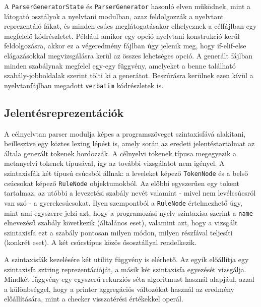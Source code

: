 \documentclass[twoside, 12pt]{report}
\begin{document}
A \verb|ParserGeneratorState| és \verb|ParserGenerator| hasonló elven működnek, mint a látogató osztályok a nyelvtani modulban, azaz feldolgozzák a nyelvtant reprezentáló fákat, és minden csúcs meglátogatásakor elhelyeznek a célfájlban egy megfelelő kódrészletet. Például amikor egy opció nyelvtani konstrukció kerül feldolgozásra, akkor ez a végeredmény fájlban úgy jelenik meg, hogy if-elif-else elágazásokkal megvizsgálásra kerül az összes lehetséges opció. A generált fájlban minden szabálynak megfelel egy-egy függvény, amelyeket a benne található szabály-jobboldalak szerint tölti ki a generátot. Beszúrásra kerülnek ezen kívül a nyelvtanfájlban megadott \verb|verbatim| kódrészletek is.

\subsection{Jelentésreprezentációk}

A célnyelvtan parser modulja képes a programszöveget szintaxisfává alakítani, beillesztve egy köztes lexing lépést is, amely során az eredeti jelentéstartalmat az általa generált tokenek hordozzák. A célnyelvi tokenek típusa megegyezik a metanyelvi tokenek típusával, így az további vizsgálatot nem igényel. A szintaxisfák két típusú csúcsból állnak: a leveleket képező \verb|TokenNode| és a belső csúcsokat képező \verb|RuleNode| objektumokból. Az előbbi egyszerűen egy tokent tartalmaz, az utóbbi a levezetési szabály nevét valamint - mivel nem levélcsúcsról van szó - a gyerekcsúcsokat. Ilyen szempontból a \verb|RuleNode| értelmezhető úgy, mint ami egyszerre jelzi azt, hogy a programozási nyelv szintaxisa szerint a \verb|name| elnevezésű szabály következik (általános eset), valamint azt, hogy a vizsgált szintaxisfa ezt a szabály pontosan milyen módon, milyen részfával teljesíti (konkrét eset). A két csúcstípus közös ősosztállyal rendelkezik.

A szintaxisfák kezelésére két utility függvény is elérhető. Az egyik előállítja egy szintaxisfa sztring reprezentációját, a másik két szintaxisfa egyezését vizsgálja. Mindkét függvény egy egyszerű rekurziós séta algoritmust használ alapjául, azzal a különbséggel, hogy a printer aggregációs változókat használ az eredmény előállítására, mint a checker visszatérési értékekkel operál.
\end{document}
